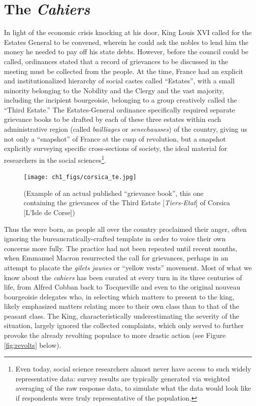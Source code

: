 \section{The \textit{Cahiers}}

In light of the economic crisis knocking at his door, King Louis XVI called for the Estates General to be convened, wherein he could ask the nobles to lend him the money he needed to pay off his state debts. However, before the council could be called, ordinances stated that a record of grievances to be discussed in the meeting must be collected from the people. At the time, France had an explicit and institutionalized hierarchy of social castes called ``Estates'', with a small minority belonging to the Nobility and the Clergy and the vast majority, including the incipient bourgeoisie, belonging to a group creatively called the ``Third Estate.'' The Estates-General ordinance specifically required separate grievance books to be drafted by each of these three estates within each administrative region (called \textit{bailliages} or \textit{senechausses}) of the country, giving us not only a ``snapshot'' of France at the cusp of revolution, but a snapshot explicitly surveying specific cross-sections of society, the ideal material for researchers in the social sciences\footnote{Even today, social science researchers almost never have access to such widely representative data: survey results are typically generated via weighted averaging of the raw response data, to simulate what the data would look like if respondents were truly representative of the population.}.

\begin{figure}
    \centering
    \texttt{[image: ch1\_figs/corsica\_te.jpg]}
    \caption{(Example of an actual published ``grievance book'', this one containing the grievances of the Third Estate [\textit{Tiers-Etat}] of Corsica [L'Isle de Corse])}
    \label{fig:cahier}
\end{figure}

Thus the \cahiers{} were born, as people all over the country proclaimed their anger, often ignoring the bureaucratically-crafted template in order to voice their own concerns more fully. The practice had not been repeated until recent months, when Emmanuel Macron resurrected the call for grievances, perhaps in an attempt to placate the \textit{gilets jaunes} or ``yellow vests'' movement. Most of what we know about the \textit{cahiers} has been curated at every turn in its three centuries of life, from Alfred Cobban back to Tocqueville and even to the original nouveau bourgeoisie delegates who, in selecting which matters to present to the king, likely emphasized matters relating more to their own class than to that of the peasant class. The King, characteristically underestimating the severity of the situation, largely ignored the collected complaints, which only served to further provoke the already revolting populace to more drastic action (see Figure \ref{fig:revolts} below).

